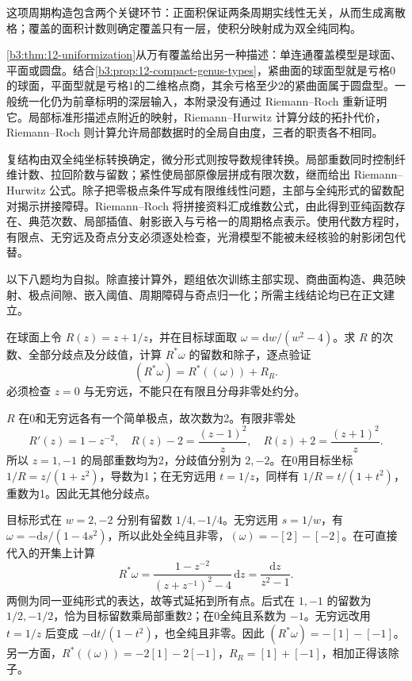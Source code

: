 这项周期构造包含两个关键环节：正面积保证两条周期实线性无关，从而生成离散格；覆盖的面积计数则确定覆盖只有一层，使积分映射成为双全纯同构。

\ProseParagraphBreak
\cref{b3:thm:12-uniformization}从万有覆盖给出另一种描述：单连通覆盖模型是球面、平面或圆盘。结合\cref{b3:prop:12-compact-genus-types}，紧曲面的球面型就是亏格0的球面，平面型就是亏格1的二维格点商，其余亏格至少2的紧曲面属于圆盘型。一般统一化仍为前章标明的深层输入，本附录没有通过 Riemann--Roch 重新证明它。局部标准形描述点附近的映射，Riemann--Hurwitz 计算分歧的拓扑代价，Riemann--Roch 则计算允许局部数据时的全局自由度，三者的职责各不相同。

\begin{chaptersummary}
复结构由双全纯坐标转换确定，微分形式则按导数规律转换。局部重数同时控制纤维计数、拉回阶数与留数；紧性使局部原像层拼成有限次数，继而给出 Riemann--Hurwitz 公式。除子把零极点条件写成有限维线性问题，主部与全纯形式的留数配对揭示拼接障碍。Riemann--Roch 将拼接资料汇成维数公式，由此得到亚纯函数存在、典范次数、局部插值、射影嵌入与亏格一的周期格点表示。使用代数方程时，有限点、无穷远及奇点分支必须逐处检查，光滑模型不能被未经核验的射影闭包代替。
\end{chaptersummary}

\BookExercises

以下八题均为自拟。除直接计算外，题组依次训练主部实现、商曲面构造、典范映射、极点间隙、嵌入阈值、周期障碍与奇点归一化；所需主线结论均已在正文建立。

\begin{exercise}\label{b3:ex:A-1}
在球面上令 \(R(z)=z+1/z\)，并在目标球面取 \(\omega=\mathrm{d}w/(w^2-4)\)。求 \(R\) 的次数、全部分歧点及分歧值，计算 \(R^*\omega\) 的留数和除子，逐点验证
\[
 (R^*\omega)=R^*((\omega))+R_R.
\]
必须检查 \(z=0\) 与无穷远，不能只在有限且分母非零处约分。
\end{exercise}
\begin{solution}
\(R\) 在0和无穷远各有一个简单极点，故次数为2。有限非零处
\[
 R'(z)=1-z^{-2},\quad
 R(z)-2=\frac{(z-1)^2}{z},\quad
 R(z)+2=\frac{(z+1)^2}{z}.
\]
所以 \(z=1,-1\) 的局部重数均为2，分歧值分别为 \(2,-2\)。在0用目标坐标 \(1/R=z/(1+z^2)\)，导数为1；在无穷远用 \(t=1/z\)，同样有 \(1/R=t/(1+t^2)\)，重数为1。因此无其他分歧点。

目标形式在 \(w=2,-2\) 分别有留数 \(1/4,-1/4\)。无穷远用 \(s=1/w\)，有 \(\omega=-\mathrm{d}s/(1-4s^2)\)，所以此处全纯且非零，\((\omega)=-[2]-[-2]\)。在可直接代入的开集上计算
\[
 R^*\omega
 =\frac{1-z^{-2}}{(z+z^{-1})^2-4}\,\mathrm{d}z
 =\frac{\mathrm{d}z}{z^2-1}.
\]
两侧为同一亚纯形式的表达，故等式延拓到所有点。后式在 \(1,-1\) 的留数为 \(1/2,-1/2\)，恰为目标留数乘局部重数2；在0全纯且系数为 \(-1\)。无穷远改用 \(t=1/z\) 后变成 \(-\mathrm{d}t/(1-t^2)\)，也全纯且非零。因此 \((R^*\omega)=-[1]-[-1]\)。另一方面，\(R^*((\omega))=-2[1]-2[-1]\)，\(R_R=[1]+[-1]\)，相加正得该除子。
\end{solution}

